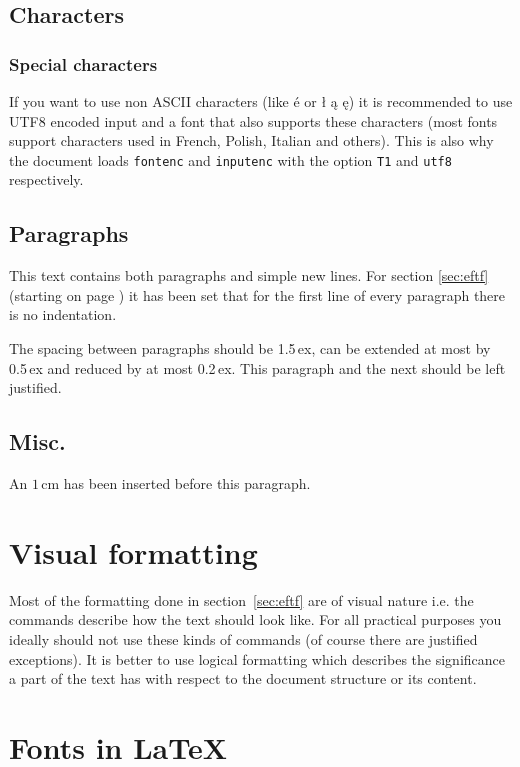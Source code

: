 \documentclass[11pt, a4paper]{article}
\newcommand{\ltx}{\LaTeX}
\begin{document}
\subsection{Characters}

\subsubsection{Special characters}
If you want to use non ASCII characters (like é or ł ą ę) it is recommended to use UTF8 encoded input and a font that also supports these characters (most fonts support characters used in French, Polish, Italian and others). This is also why the document loads \texttt{fontenc} and \texttt{inputenc} with the option \texttt{T1} and \texttt{utf8} respectively.

\subsection{Paragraphs}
This text contains both paragraphs and simple new lines. For section \ref{sec:eftf} (starting on page \pageref{sec:eftf}) it has been set that for the first line of every paragraph there is no indentation.

\begingroup
\raggedright %
The spacing between paragraphs should be 1.5\,ex, can be extended at most by 0.5\,ex and reduced by at most 0.2\,ex. This paragraph and the next should be left justified. 

\vspace{1cm}
\subsection{Misc.} 
An  $1$\,cm has been inserted before this paragraph.
\endgroup
\endgroup

\section{Visual formatting}
Most of the formatting done in section~\ref{sec:eftf}  are of visual nature i.e. the commands describe how the text should look like. For all practical purposes you ideally should not use these kinds of commands (of course there are justified exceptions). It is better to use logical formatting which describes the significance a part of the text has with respect to the document structure or its content.

\section{Fonts in \ltx}
\end{document}
